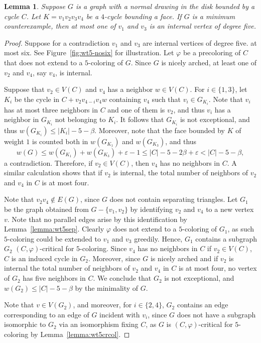 \documentclass[12pt,twoside,openright,a4paper]{book}
\newtheorem{lemma}[theorem]{Lemma}
\begin{document}
\begin{lemma}\label{lemma:wt5-four}
Suppose $G$ is a graph with a normal drawing in the disk bounded by a cycle $C$.
Let $K=v_1v_2v_3v_4$ be a $4$-cycle bounding a face.
If $G$ is a minimum counterexample, then at most one of $v_1$ and $v_3$ is an internal vertex of degree five.
\end{lemma}
\begin{proof}
Suppose for a contradiction $v_1$ and $v_3$ are internal vertices of degree five.
at most six.  See Figure~\ref{fig:wt5-nosix} for illustration.
Let $\varphi$ be a precoloring of $C$ that does not extend to a $5$-coloring of $G$.
Since $G$ is nicely arched, at least one of $v_2$ and $v_4$, say $v_4$, is internal.

Suppose that $v_2\in V(C)$ and $v_4$ has a neighbor $w\in V(C)$.  For $i\in \{1,3\}$,
let $K_i$ be the cycle in $C+v_2v_{4-i}v_4w$ containing $v_4$ such that $v_i\in G_{K_i}$.
Note that $v_i$ has at most three neighbors in $C$ and one of them is $v_2$, and thus
$v_i$ has a neighbor in $G_{K_i}$ not belonging to $K_i$.
It follows that $G_{K_i}$ is not exceptional, and thus $w(G_{K_i})\le |K_i|-5-\beta$.
Moreover, note that the face bounded by $K$ of weight $1$ is counted both in $w(G_{K_1})$
and $w(G_{K_3})$, and thus
$$w(G)\le w(G_{K_1})+w(G_{K_3})+\varepsilon-1\le |C|-5-2\beta+\varepsilon<|C|-5-\beta,$$
a contradiction.  Therefore, if $v_2\in V(C)$, then $v_4$ has no neighbors in $C$.
A similar calculation shows that if $v_2$ is internal, the total number of neighbors of $v_2$
and $v_4$ in $C$ is at most four.

Note that $v_2v_4\not\in E(G)$, since $G$ does not contain separating triangles.
Let $G_1$ be the graph obtained from $G-\{v_1,v_2\}$ by identifying $v_2$ and $v_4$ to a new vertex $v$.
Note that no parallel edges arise by this identification by Lemma~\ref{lemma:wt5sep}.
Clearly $\varphi$ does not extend to a $5$-coloring of $G_1$, as such $5$-coloring could be extended
to $v_1$ and $v_3$ greedily.  Hence, $G_1$ contains a subgraph $G_2$ $(C,\varphi)$-critical for $5$-coloring.
Since $v_4$ has no neighbors in $C$ if $v_2\in V(C)$, $C$ is an induced cycle in $G_2$.  Moreover, since
$G$ is nicely arched and if $v_2$ is internal the total number of neighbors of $v_2$
and $v_4$ in $C$ is at most four, no vertex of $G_2$ has five neighbors in $C$.
We conclude that $G_2$ is not exceptional, and $w(G_2)\le |C|-5-\beta$ by the minimality of $G$.

Note that $v\in V(G_2)$, and moreover, for $i\in\{2,4\}$, $G_2$ contains an edge corresponding to an edge of $G$
incident with $v_i$, since $G$ does not have a subgraph isomorphic to $G_2$
via an isomorphism fixing $C$, as $G$ is $(C,\varphi)$-critical for $5$-coloring by Lemma~\ref{lemma:wt5crcol}.


\end{proof}
\end{document}
